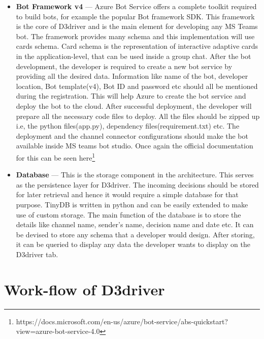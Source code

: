 \begin{itemize}
\item  \textbf{Bot Framework v4} --- Azure Bot Service offers a complete toolkit required to build bots, for example the popular Bot framework SDK. This framework is the core of D3driver and is the main element for developing any MS Teams bot. The framework provides many schema and this implementation will use cards schema. Card schema is the representation of interactive adaptive cards in the application-level, that can be used inside a group chat. After the bot development, the developer is required to create a new bot service by providing all the desired data. Information like name of the bot, developer location, Bot template(v4), Bot ID and password etc should all be mentioned during the registration. This will help Azure to create the bot service and deploy the bot to the cloud. After successful deployment, the developer will prepare all the necessary code files to deploy. All the files should be zipped up i.e, the python files(app.py), dependency files(requirement.txt) etc. The deployment and the channel connector configurations should make the bot available inside MS teams bot studio. Once again the official documentation for this can be seen here\footnote{https://docs.microsoft.com/en-us/azure/bot-service/abs-quickstart?view=azure-bot-service-4.0}

\item \textbf{Database} --- This is the storage component in the architecture. This serves as the persistence layer for D3driver. The incoming decisions should be stored for later retrieval and hence it would require a simple database for that purpose. TinyDB is written in python and can be easily extended to make use of custom storage. The main function of the database is to store the details like channel name, sender’s name, decision name and date etc. It can be devised to store any schema that a developer would design. After storing, it can be queried to display any data the developer wants to display on the D3driver tab.

\end{itemize}



\section{Work-flow of D3driver}

